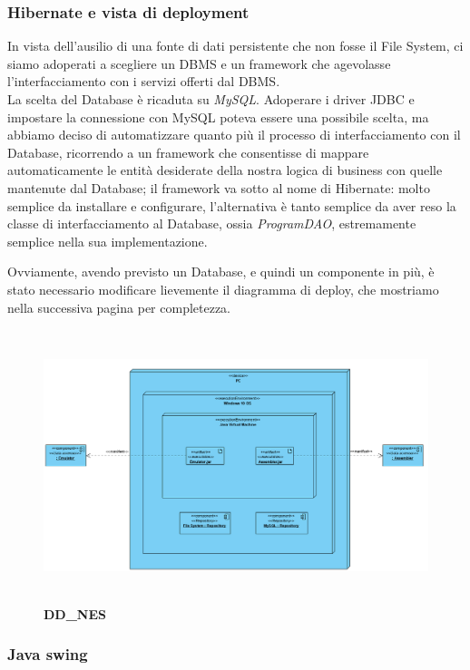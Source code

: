 \documentclass[11pt]{article}
\begin{document}
\subsubsection{Hibernate e vista di deployment}
In vista dell'ausilio di una fonte di dati persistente che non fosse il File System, ci siamo adoperati a scegliere un DBMS e un framework che agevolasse l'interfacciamento con i servizi offerti dal DBMS.\\
La scelta del Database è ricaduta su \emph{MySQL}. Adoperare i driver JDBC e impostare la connessione con MySQL poteva essere una possibile scelta, ma abbiamo deciso di automatizzare quanto più il processo di interfacciamento con il Database, ricorrendo a un framework che consentisse di mappare automaticamente le entità desiderate della nostra logica di business con quelle mantenute dal Database; il framework va sotto al nome di Hibernate: molto semplice da installare e configurare, l'alternativa è tanto semplice da aver reso la classe di interfacciamento al Database, ossia \emph{ProgramDAO}, estremamente semplice nella sua implementazione.

Ovviamente, avendo previsto un Database, e quindi un componente in più, è stato necessario modificare lievemente il diagramma di deploy, che mostriamo nella successiva pagina per completezza.
\begin{figure}[h]
\hspace*{-3cm}
\centering
\includegraphics[width=550px, height=300px]{DD_NES_1.png}\\
\small\textbf{DD\_NES}
\end{figure}
\clearpage

\subsubsection{Java swing }
\end{document}
